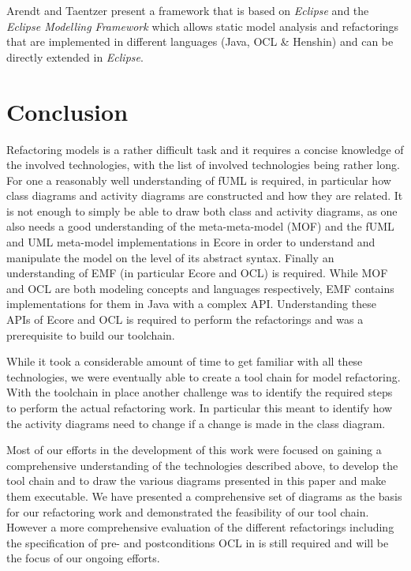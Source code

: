 \documentclass{llncs}
\begin{document}

Arendt and Taentzer \cite{DBLP:journals/ase/ArendtT13} present a framework that is based on \textit{Eclipse} and the
\textit{Eclipse Modelling Framework} which allows static model analysis and refactorings that are implemented in
different languages (Java, OCL \& Henshin) and can be directly extended in \textit{Eclipse}.


\section{Conclusion}
\label{sec:conclusion}
Refactoring models is a rather difficult task and it requires a concise knowledge of the involved technologies, with
the list of involved technologies being rather long. For one a reasonably well understanding of fUML is required, in
particular how class diagrams and activity diagrams are constructed and how they are related. It is not enough to simply
be able to draw both class and activity diagrams, as one also needs a good understanding of the meta-meta-model (MOF) and
the fUML and UML meta-model implementations in Ecore in order to understand and manipulate the model on the level of its 
abstract syntax. Finally an understanding of EMF (in particular Ecore and OCL) is required. While MOF and OCL are both 
modeling concepts and languages respectively, EMF contains implementations for them in Java with a complex API. 
Understanding these APIs of Ecore and OCL is required to perform the refactorings and was a prerequisite to build
our toolchain.

While it took a considerable amount of time to get familiar with all these technologies, we were eventually able to
create a tool chain for model refactoring. With the toolchain in place another challenge was to identify the required 
steps to perform the actual refactoring work. In particular this meant to identify how the activity diagrams need to 
change if a change is made in the class diagram.

Most of our efforts in the development of this work were focused on gaining a comprehensive understanding of the
technologies described above, to develop the tool chain and to draw the various diagrams presented in this paper and make 
them executable. We have presented a comprehensive set of diagrams as the basis for our refactoring work and demonstrated 
the feasibility of our tool chain. However a more comprehensive evaluation of the different refactorings including the 
specification of pre- and postconditions OCL in is still required and will be the focus of our ongoing efforts.
\end{document}
